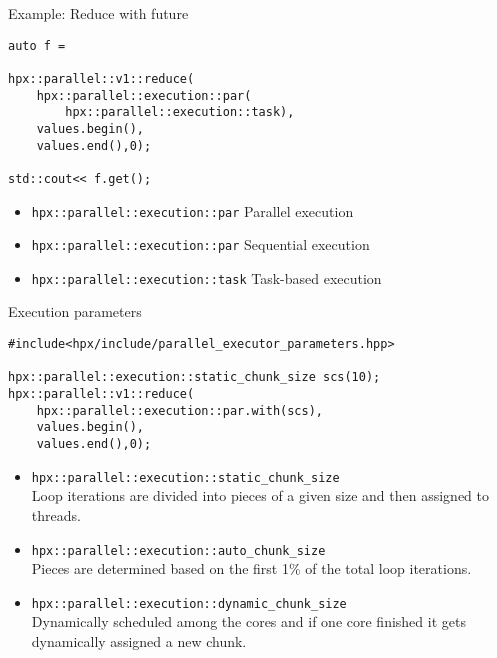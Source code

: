 \documentclass[12pt,t]{beamer}
\begin{document}
\begin{frame}[fragile]{Example: Reduce with future}


\begin{lstlisting}
auto f =

hpx::parallel::v1::reduce(
	hpx::parallel::execution::par(
		hpx::parallel::execution::task),
	values.begin(),
	values.end(),0);

std::cout<< f.get();
\end{lstlisting}

\begin{itemize}
\item \lstinline|hpx::parallel::execution::par| Parallel execution
\item \lstinline|hpx::parallel::execution::par| Sequential execution
\item \lstinline|hpx::parallel::execution::task| Task-based execution
\end{itemize}

\end{frame}


\begin{frame}[fragile]{Execution parameters}


\begin{lstlisting}
#include<hpx/include/parallel_executor_parameters.hpp>

hpx::parallel::execution::static_chunk_size scs(10);
hpx::parallel::v1::reduce(
	hpx::parallel::execution::par.with(scs),
	values.begin(),
	values.end(),0);
\end{lstlisting}

\begin{itemize}
\item \lstinline|hpx::parallel::execution::static_chunk_size| \\
Loop iterations are divided into pieces of a given size and then assigned to threads.
\item \lstinline|hpx::parallel::execution::auto_chunk_size| \\
Pieces are determined based on the first 1\% of the total loop iterations. 
\item \lstinline|hpx::parallel::execution::dynamic_chunk_size| \\
Dynamically scheduled among the cores and if one core finished it gets dynamically assigned a new chunk.


\end{itemize}

\end{frame}
\end{document}
